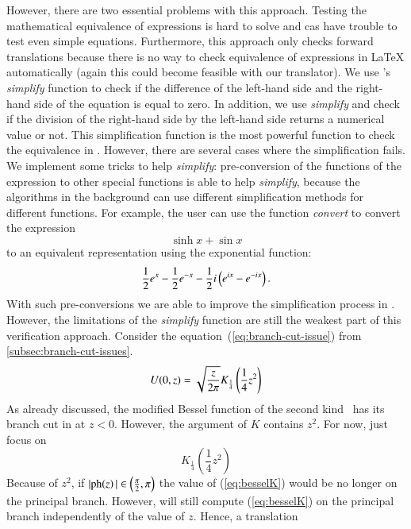 However, there are two essential problems with this approach. Testing the mathematical equivalence of expressions is hard to solve and \gls{cas} have trouble to test even simple equations. Furthermore, this approach only checks forward translations because there is no way to check equivalence of expressions in \LaTeX{} automatically (again this could become feasible with our translator). We use \Maple's \textit{simplify} function to check if the difference of the left-hand side and the right-hand side of the equation is equal to zero. In addition, we use \textit{simplify} and check if the division of the right-hand side by the left-hand side returns a numerical value or not. This simplification function is the most powerful function to check the equivalence in \Maple. However, there are several cases where the simplification fails. We implement some tricks to help \textit{simplify}: pre-conversion of the functions of the expression to other special functions is able to help \textit{simplify}, because the algorithms in the background can use different simplification methods for different functions. For example, the user can use the \Maple{} function \textit{convert} to convert the expression
\begin{equation}
\sinh{x} + \sin{x}
\end{equation}
to an equivalent representation using the exponential function:
\begin{equation}
\frac{1}{2}{e}^x - \frac{1}{2}{e}^{-x} - \frac{1}{2} {i} \left( {e}^{{i} x}-{e}^{-{i} x} \right).
\end{equation}
With such pre-conversions we are able to improve the simplification process in \Maple. However, the limitations of the \textit{simplify} function are still the weakest part of this verification approach. Consider the equation~(\ref{eq:branch-cut-issue}) from \cref{subsec:branch-cut-issues}. 
\begin{equation}\label{eq:branch-cut-near}
\displaystyle U(0,z) = \sqrt{\frac{z}{2{\pi}}} K_{\frac{1}{4}}\left(\frac{1}{4}z^2\right)
\end{equation}
As already discussed, the modified Bessel function of the second kind~\parencite[(12.7.10)]{NIST:DLMF} has its branch cut in \Maple{} at $z < 0$. However, the argument of $K$ contains $z^2$. For now, just focus on
\begin{equation}\label{eq:besselK}
K_{\frac{1}{4}}\left(\frac{1}{4}z^2\right)
\end{equation}
Because of $z^2$, if $|\mathrm{ph}\!\left(z\right)| \in \left(\frac{{\pi}}{2}, {\pi}\right)$ the value of (\ref{eq:besselK}) would be no longer on the principal branch. However, \Maple{} will still compute (\ref{eq:besselK}) on the principal branch independently of the value of $z$. Hence, a translation
